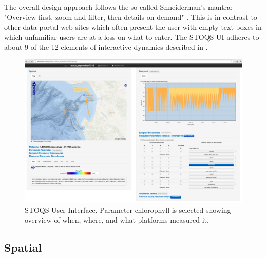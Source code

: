 \documentclass[conference]{IEEEtran}
\begin{document}
The overall design approach follows the so-called Shneiderman's mantra: "Overview first, zoom and filter, then details-on-demand" \cite{Whitney:2012:DIN:2597850}. This is in contrast to other data portal web sites which often present the user with empty text boxes in which unfamiliar users are at a loss on what to enter. The STOQS UI adheres to about 9 of the 12 elements of interactive dynamics described in \cite{Heer:2012:IDV:2133416.2146416}.

\begin{figure}[htbp]
\centering
\includegraphics[width=6.6in]{STOQSscreencapture.png}
\caption{STOQS User Interface. Parameter chlorophyll is selected showing overview of when, where, and what platforms measured it.}
\label{fig:STOQSscreencapture}
\end{figure}

\subsection{Spatial}
\end{document}
